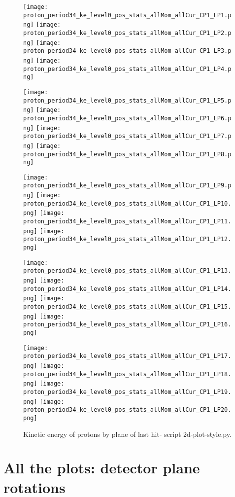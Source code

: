   
     \begin{figure}	   
 \centering
  \texttt{[image: proton\_period34\_ke\_level0\_pos\_stats\_allMom\_allCur\_CP1\_LP1.png]}
\texttt{[image: proton\_period34\_ke\_level0\_pos\_stats\_allMom\_allCur\_CP1\_LP2.png]}
\texttt{[image: proton\_period34\_ke\_level0\_pos\_stats\_allMom\_allCur\_CP1\_LP3.png]}
\texttt{[image: proton\_period34\_ke\_level0\_pos\_stats\_allMom\_allCur\_CP1\_LP4.png]}

\texttt{[image: proton\_period34\_ke\_level0\_pos\_stats\_allMom\_allCur\_CP1\_LP5.png]}
\texttt{[image: proton\_period34\_ke\_level0\_pos\_stats\_allMom\_allCur\_CP1\_LP6.png]}
\texttt{[image: proton\_period34\_ke\_level0\_pos\_stats\_allMom\_allCur\_CP1\_LP7.png]}
\texttt{[image: proton\_period34\_ke\_level0\_pos\_stats\_allMom\_allCur\_CP1\_LP8.png]}

\texttt{[image: proton\_period34\_ke\_level0\_pos\_stats\_allMom\_allCur\_CP1\_LP9.png]}
\texttt{[image: proton\_period34\_ke\_level0\_pos\_stats\_allMom\_allCur\_CP1\_LP10.png]}
\texttt{[image: proton\_period34\_ke\_level0\_pos\_stats\_allMom\_allCur\_CP1\_LP11.png]}
\texttt{[image: proton\_period34\_ke\_level0\_pos\_stats\_allMom\_allCur\_CP1\_LP12.png]}

\texttt{[image: proton\_period34\_ke\_level0\_pos\_stats\_allMom\_allCur\_CP1\_LP13.png]}
\texttt{[image: proton\_period34\_ke\_level0\_pos\_stats\_allMom\_allCur\_CP1\_LP14.png]}
\texttt{[image: proton\_period34\_ke\_level0\_pos\_stats\_allMom\_allCur\_CP1\_LP15.png]}
\texttt{[image: proton\_period34\_ke\_level0\_pos\_stats\_allMom\_allCur\_CP1\_LP16.png]}


\texttt{[image: proton\_period34\_ke\_level0\_pos\_stats\_allMom\_allCur\_CP1\_LP17.png]}
\texttt{[image: proton\_period34\_ke\_level0\_pos\_stats\_allMom\_allCur\_CP1\_LP18.png]}
\texttt{[image: proton\_period34\_ke\_level0\_pos\_stats\_allMom\_allCur\_CP1\_LP19.png]}
\texttt{[image: proton\_period34\_ke\_level0\_pos\_stats\_allMom\_allCur\_CP1\_LP20.png]}

  \caption{Kinetic energy of protons by plane of last hit- script 2d-plot-style.py.}			
   \label{fig_detdrpe}
  \end{figure}
  
  
  
  
  
  
  
  
  
%
\section{All the plots: detector plane rotations}\label{app_fit_XY}

